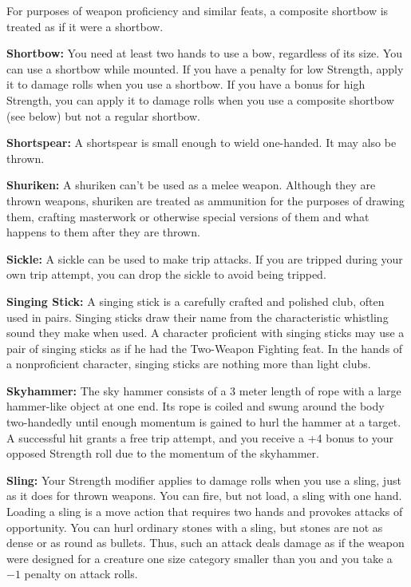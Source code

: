 For purposes of weapon proficiency and similar feats, a composite shortbow is treated as if it were a shortbow. 

\textbf{Shortbow:} You need at least two hands to use a bow, regardless of its size. You can use a shortbow while mounted. If you have a penalty for low Strength, apply it to damage rolls when you use a shortbow. If you have a bonus for high Strength, you can apply it to damage rolls when you use a composite shortbow (see below) but not a regular shortbow. 

\textbf{Shortspear:} A shortspear is small enough to wield one-handed. It may also be thrown. 

\textbf{Shuriken:} A shuriken can't be used as a melee weapon. Although they are thrown weapons, shuriken are treated as ammunition for the purposes of drawing them, crafting masterwork or otherwise special versions of them and what happens to them after they are thrown. 

\textbf{Sickle:} A sickle can be used to make trip attacks. If you are tripped during your own trip attempt, you can drop the sickle to avoid being tripped. 

\textbf{Singing Stick:} A singing stick is a carefully crafted and polished club, often used in pairs. Singing sticks draw their name from the characteristic whistling sound they make when used. A character proficient with singing sticks may use a pair of singing sticks as if he had the Two-Weapon Fighting feat. In the hands of a nonproficient character, singing sticks are nothing more than light clubs.

\textbf{Skyhammer:} The sky hammer consists of a 3 meter length of rope with a large hammer-like object at one end. Its rope is coiled and swung around the body two-handedly until enough momentum is gained to hurl the hammer at a target. A successful hit grants a free trip attempt, and you receive a +4 bonus to your opposed Strength roll due to the momentum of the skyhammer.

\textbf{Sling:} Your Strength modifier applies to damage rolls when you use a sling, just as it does for thrown weapons. You can fire, but not load, a sling with one hand. Loading a sling is a move action that requires two hands and provokes attacks of opportunity.  You can hurl ordinary stones with a sling, but stones are not as dense or as round as bullets. Thus, such an attack deals damage as if the weapon were designed for a creature one size category smaller than you and you take a $-1$ penalty on attack rolls. 

